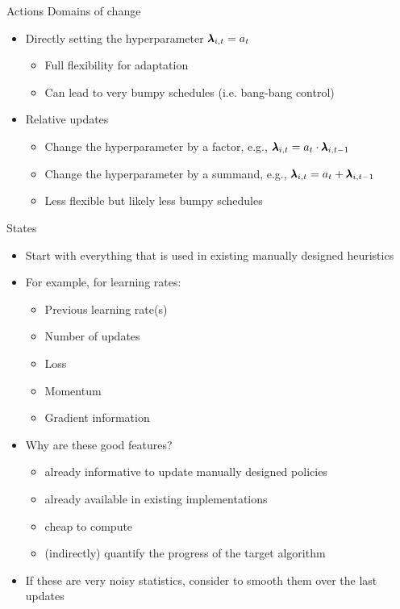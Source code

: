 \documentclass[main]{subfiles}
\begin{document}
\begin{frame}{Actions}
Domains of change
    \begin{itemize}
        \item Directly setting the hyperparameter $\pmb{\lambda}_{i,t} = a_t$
        \begin{itemize}\pause
            \item Full flexibility for adaptation
            \item Can lead to very bumpy schedules (i.e. bang-bang control)
        \end{itemize}\pause
        \item Relative updates
        \begin{itemize}\pause
            \item Change the hyperparameter by a factor, e.g., $\pmb{\lambda}_{i,t} = a_t\cdot\pmb{\lambda}_{i,t-1}$
            \item Change the hyperparameter by a summand, e.g., $\pmb{\lambda}_{i,t} = a_t+\pmb{\lambda}_{i,t-1}$
            \item Less flexible but likely less bumpy schedules
        \end{itemize}
    \end{itemize}
\end{frame}
\begin{frame}{States}
    \begin{itemize}
        \item Start with everything that is used in existing manually designed heuristics\pause
        \item For example, for learning rates:
        \begin{itemize}\pause
            \item Previous learning rate(s)
            \item Number of updates
            \item Loss
            \item Momentum
            \item Gradient information
        \end{itemize}\pause
        \item Why are these good features?
        \begin{itemize}\pause
            \item already informative to update manually designed policies
            \item already available in existing implementations
            \item cheap to compute
            \item (indirectly) quantify the progress of the target algorithm
        \end{itemize}\pause
        \item If these are very noisy statistics, consider to smooth them over the last updates
    \end{itemize}
\end{frame}
\end{document}
